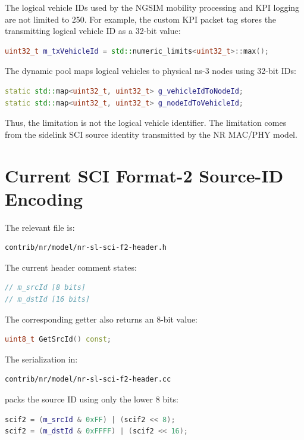 \documentclass[11pt]{article}
\begin{document}
The logical vehicle IDs used by the NGSIM mobility processing and KPI logging are not limited to 250. For example, the custom KPI packet tag stores the transmitting logical vehicle ID as a 32-bit value:

\begin{lstlisting}[language=C++]
uint32_t m_txVehicleId = std::numeric_limits<uint32_t>::max();
\end{lstlisting}

The dynamic pool maps logical vehicles to physical ns-3 nodes using 32-bit IDs:

\begin{lstlisting}[language=C++]
static std::map<uint32_t, uint32_t> g_vehicleIdToNodeId;
static std::map<uint32_t, uint32_t> g_nodeIdToVehicleId;
\end{lstlisting}

Thus, the limitation is not the logical vehicle identifier. The limitation comes from the sidelink SCI source identity transmitted by the NR MAC/PHY model.

\section{Current SCI Format-2 Source-ID Encoding}

The relevant file is:

\begin{lstlisting}
contrib/nr/model/nr-sl-sci-f2-header.h
\end{lstlisting}

The current header comment states:

\begin{lstlisting}[language=C++]
// m_srcId [8 bits]
// m_dstId [16 bits]
\end{lstlisting}

The corresponding getter also returns an 8-bit value:

\begin{lstlisting}[language=C++]
uint8_t GetSrcId() const;
\end{lstlisting}

The serialization in:

\begin{lstlisting}
contrib/nr/model/nr-sl-sci-f2-header.cc
\end{lstlisting}

packs the source ID using only the lower 8 bits:

\begin{lstlisting}[language=C++]
scif2 = (m_srcId & 0xFF) | (scif2 << 8);
scif2 = (m_dstId & 0xFFFF) | (scif2 << 16);
\end{lstlisting}
\end{document}
